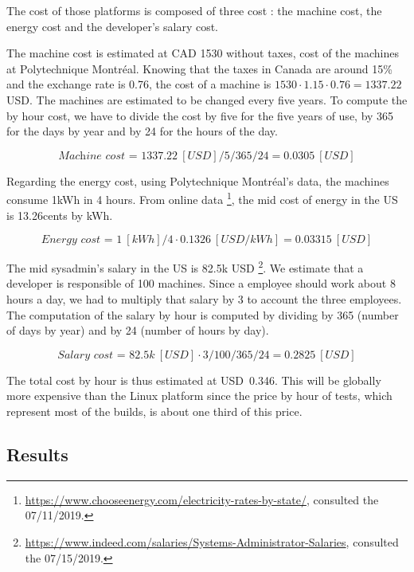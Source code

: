 
The cost of those platforms is composed of three cost : the machine cost, the energy cost and the developer's salary cost. 

The machine cost is estimated at CAD 1530 without taxes, cost of the machines at Polytechnique Montréal. Knowing that the taxes in Canada are around 15\% and the exchange rate is 0.76, the cost of a machine is $1530 \cdot 1.15 \cdot 0.76=1337.22$ USD. The machines are estimated to be changed every five years. To compute the by hour cost,  we have to divide the cost by five for the five years of use, by 365 for the days by year and by 24 for the hours of the day. 

$$\textit{Machine cost = } 1337.22~[USD] / 5 / 365 / 24 = 0.0305~[USD]$$

Regarding the energy cost, using Polytechnique Montréal's data, the machines consume 1kWh in 4 hours. From online data \footnote{\url{https://www.chooseenergy.com/electricity-rates-by-state/}, consulted the 07/11/2019.}, the mid cost of energy in the US is 13.26cents by kWh.

$$\textit{Energy cost = } 1~[kWh] / 4 \cdot 0.1326~[USD/kWh] = 0.03315~[USD]$$

The mid sysadmin's salary in the US is 82.5k USD \footnote{\href{https://www.indeed.com/salaries/Systems-Administrator-Salaries}{https://www.indeed.com/salaries/Systems-Administrator-Salaries}, consulted the 07/15/2019.}. We estimate that a developer is responsible of 100 machines. Since a employee should work about 8 hours a day, we had to multiply that salary by 3 to account the three employees. The computation of the salary by hour is computed by dividing by 365 (number of days by year) and by 24 (number of hours by day).

$$ \textit{Salary cost = }82.5k~[USD] \cdot 3 / 100 / 365 / 24 = 0.2825~[USD] $$ 

The total cost by hour is thus estimated at USD~0.346. This will be globally more expensive than the Linux platform since the price by hour of tests, which represent most of the builds, is about one third of this price.

\subsection{Results}

